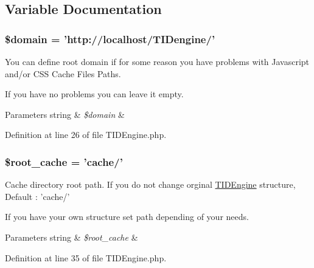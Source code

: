 \subsection{Variable Documentation}
\hypertarget{group__paths__settings_gaef9cf198312d2f89238a8e8e2f0f67f3}{
\subsubsection[{\$domain}]{\setlength{\rightskip}{0pt plus 5cm}\$domain = 'http://localhost/TIDengine/'}}
\label{group__paths__settings_gaef9cf198312d2f89238a8e8e2f0f67f3}
You can define root domain if for some reason you have problems with Javascript and/or CSS Cache Files Paths.\par
 If you have no problems you can leave it empty.\par
 
\begin{DoxyParams}[1]{Parameters}
string & {\em \$domain} & \\
\hline
\end{DoxyParams}


Definition at line 26 of file TIDEngine.php.

\hypertarget{group__paths__settings_gae39d9273ea31335b789e7d9a65ddd5e5}{
\subsubsection[{\$root\_\-cache}]{\setlength{\rightskip}{0pt plus 5cm}\$root\_\-cache = 'cache/'}}
\label{group__paths__settings_gae39d9273ea31335b789e7d9a65ddd5e5}
Cache directory root path. If you do not change orginal \hyperlink{class_t_i_d_engine}{TIDEngine} structure, Default : 'cache/' \par
 If you have your own structure set path depending of your needs. 
\begin{DoxyParams}[1]{Parameters}
string & {\em \$root\_\-cache} & \\
\hline
\end{DoxyParams}


Definition at line 35 of file TIDEngine.php.

